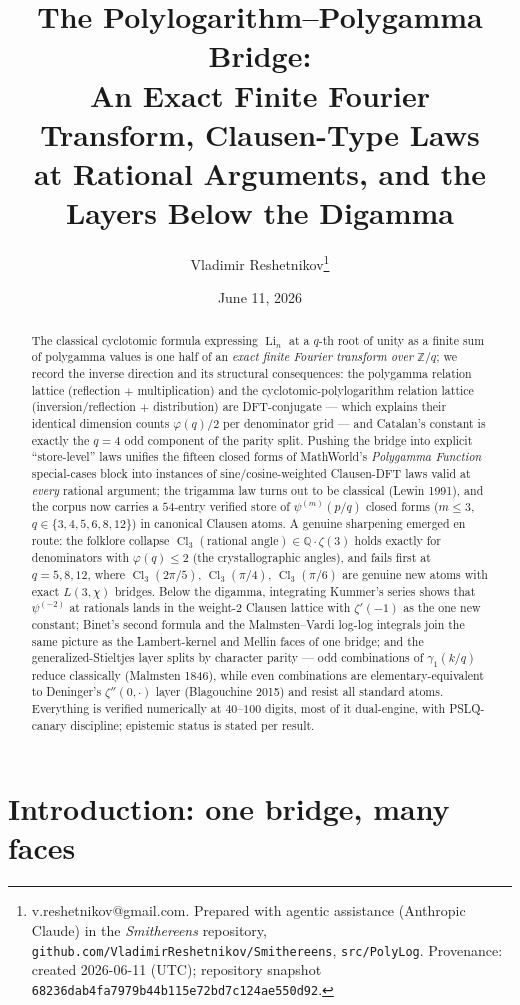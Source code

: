 \documentclass[11pt]{article}
\title{The Polylogarithm--Polygamma Bridge:\\
An Exact Finite Fourier Transform, Clausen-Type Laws\\ at Rational Arguments,
and the Layers Below the Digamma}
\author{Vladimir Reshetnikov\thanks{%
v.reshetnikov@gmail.com. Prepared with agentic assistance (Anthropic Claude) in the
\emph{Smithereens} repository,
\texttt{github.com/VladimirReshetnikov/Smithereens}, \texttt{src/PolyLog}.
Provenance: created 2026-06-11 (UTC); repository snapshot
\texttt{68236dab4fa7979b44b115e72bd7c124ae550d92}.}}
\date{June 11, 2026}
\theoremstyle{remark}
\newcommand{\Li}{\operatorname{Li}}
\newcommand{\Cl}{\operatorname{Cl}}
\begin{document}
\maketitle

\begin{abstract}
The classical cyclotomic formula expressing $\Li_n$ at a $q$-th root of unity as a finite
sum of polygamma values is one half of an \emph{exact finite Fourier transform over}
$\mathbb{Z}/q$; we record the inverse direction and its structural consequences: the
polygamma relation lattice (reflection $+$ multiplication) and the cyclotomic-polylogarithm
relation lattice (inversion/reflection $+$ distribution) are DFT-conjugate --- which explains
their identical dimension counts $\varphi(q)/2$ per denominator grid --- and Catalan's
constant is exactly the $q=4$ odd component of the parity split. Pushing the bridge into
explicit ``store-level'' laws unifies the fifteen closed forms of MathWorld's
\emph{Polygamma Function} special-cases block into instances of sine/cosine-weighted
Clausen-DFT laws valid at \emph{every} rational argument; the trigamma law turns out to be classical (Lewin 1991),
and the corpus now carries a $54$-entry verified store of $\psi^{(m)}(p/q)$ closed forms
($m\le 3$, $q\in\{3,4,5,6,8,12\}$) in canonical Clausen atoms. A genuine sharpening emerged
en route: the folklore collapse $\Cl_3(\text{rational angle})\in\mathbb{Q}\cdot\zeta(3)$
holds exactly for denominators with $\varphi(q)\le 2$ (the crystallographic angles), and
fails first at $q=5,8,12$, where $\Cl_3(2\pi/5)$, $\Cl_3(\pi/4)$, $\Cl_3(\pi/6)$ are genuine
new atoms with exact $L(3,\chi)$ bridges. Below the digamma, integrating Kummer's series
shows that $\psi^{(-2)}$ at rationals lands in the weight-$2$ Clausen lattice with
$\zeta'(-1)$ as the one new constant; Binet's second formula and the Malmsten--Vardi log-log
integrals join the same picture as the Lambert-kernel and Mellin faces of one bridge; and
the generalized-Stieltjes layer splits by character parity --- odd combinations of
$\gamma_1(k/q)$ reduce classically (Malmsten 1846), while even combinations are
elementary-equivalent to Deninger's $\zeta''(0,\cdot)$ layer (Blagouchine 2015) and resist
all standard atoms. Everything is verified numerically at $40$--$100$ digits, most of it
dual-engine, with PSLQ-canary discipline; epistemic status is stated per result.
\end{abstract}

\section{Introduction: one bridge, many faces}\label{sec:intro}
\end{document}
